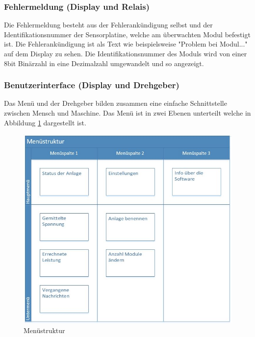 \subsubsection{Fehlermeldung (Display und Relais)}
Die Fehlermeldung besteht aus der Fehlerankündigung selbst und der Identifikationsnummer der Sensorplatine, welche am überwachten Modul befestigt ist. Die Fehlerankündigung ist als Text wie beispielsweise "Problem bei Modul..." auf dem Display zu sehen. Die Identifikationsnummer des Moduls wird von einer 8bit Binärzahl in eine Dezimalzahl umgewandelt und so angezeigt.

\subsubsection{Benutzerinterface (Display und Drehgeber)}
Das Menü und der Drehgeber bilden zusammen eine einfache Schnittstelle zwischen Mensch und Maschine. Das Menü ist in zwei Ebenen unterteilt welche in Abbildung \ref{fig:structure-menu} dargestellt ist.

\begin{figure}[htbp] 
  \centering
     \includegraphics[width=1\textwidth]{graphics/structure-menu}
  \caption{Menüstruktur}
  \label{fig:structure-menu}
\end{figure}

